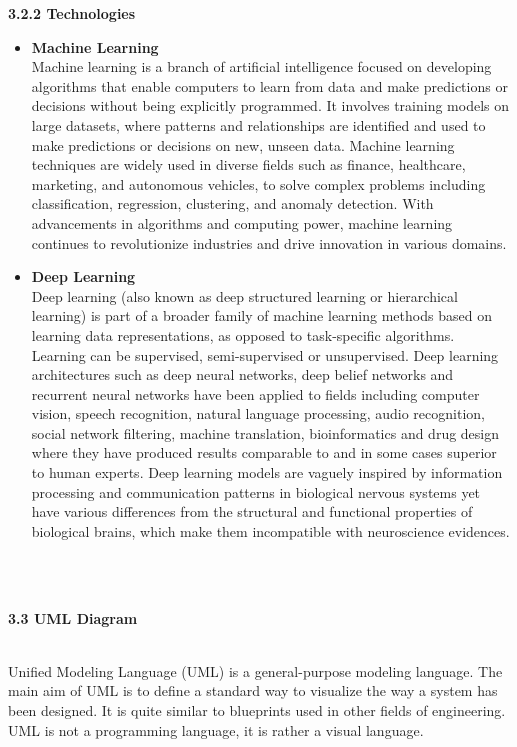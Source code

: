 \documentclass[12pt, English]{article}
\newcommand\tab[1][1cm]{\hspace*{#1}}
\begin{document}
\begin{normalsize}
\newpage
\begin{normalsize}
    \textbf{3.2.2 Technologies}
    \begin{itemize}
        \item \textbf{Machine Learning}\\
        Machine learning is a branch of artificial intelligence focused on developing algorithms that enable computers to learn from data and make predictions or decisions without being explicitly programmed. It involves training models on large datasets, where patterns and relationships are identified and used to make predictions or decisions on new, unseen data. Machine learning techniques are widely used in diverse fields such as finance, healthcare, marketing, and autonomous vehicles, to solve complex problems including classification, regression, clustering, and anomaly detection. With advancements in algorithms and computing power, machine learning continues to revolutionize industries and drive innovation in various domains.
        \item \textbf{Deep Learning}\\
Deep learning (also known as deep structured learning or hierarchical learning) is
part of a broader family of machine learning methods based on learning data representations, as
opposed to task-specific algorithms. Learning can be supervised,
semi-supervised or unsupervised. Deep learning architectures such as deep neural
networks, deep belief networks and recurrent neural networks have been applied to
fields including computer vision, speech recognition, natural language processing, audio recognition,
social network filtering, machine translation, bioinformatics and drug
design where they have produced results comparable to and in some cases superior to
human experts. Deep learning models are vaguely inspired by information processing
and communication patterns in biological nervous systems yet have various differences
from the structural and functional properties of biological brains, which make them
incompatible with neuroscience evidences.
    \end{itemize}
\end{normalsize}
\\\\

\begin{large}
\textbf{ 3.3 UML Diagram}\\
\end{large}\\
\tab Unified Modeling Language (UML) is a general-purpose modeling language. The main aim of UML is to define a standard way to visualize the way a system has been designed. It is quite similar to blueprints used in other fields of engineering. UML is not a programming language, it is rather a visual language.\\ 


\end{normalsize}
\end{document}
